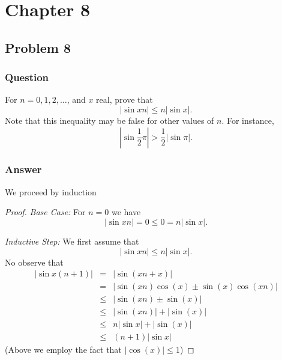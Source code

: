 \documentclass[12pt]{article}
\begin{document}
\section{Chapter 8}
\subsection{Problem 8}
\subsubsection{Question}
For $n=0,1,2,\dots$, and $x$ real, prove that
\[ \left| \sin{x n} \right| \leq n \left| \sin{x} \right|. \]
Note that this inequality may be false for other values of $n$. For instance, 
\[\left| \sin{\frac{1}{2} \pi} \right| > \frac{1}{2} \left| \sin{\pi} \right| . \]
\subsubsection{Answer}
We proceed by induction
\begin{proof}
\emph{Base Case:} For $n=0$ we have 
\[ \left| \sin{x n} \right|= 0  \leq 0 = n \left| \sin{x} \right|. \]



\emph{Inductive Step: } We first assume that 
\[ \left| \sin{x n} \right| \leq n \left| \sin{x} \right|. \]
No observe that
\begin{eqnarray*} \left| \sin{x (n+1)} \right| &=& \left| \sin{(x n+x)} \right| \\
&=& \left| \sin{(x n) \cos{(x)}  \pm \sin{(x)} \cos{(x n)}   } \right| \\
&\leq& \left| \sin{(x n) \pm \sin{(x)}    } \right| \\
&\leq& \left| \sin{(x n)} \right| + \left| \sin{(x)}    \right| \\
&\leq&  n \left| \sin{x} \right|+ \left| \sin{(x)}    \right| \\
&\leq& ( n +1) \left| \sin{x} \right|
\end{eqnarray*}
(Above we employ the fact that $|\cos(x)|\leq 1$)
\end{proof}
\end{document}

